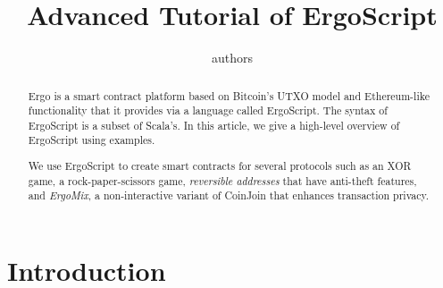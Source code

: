 \documentclass[11pt]{article}
\newcommand{\langname}{ErgoScript\xspace}
\newcommand{\mixname}{ErgoMix\xspace}
\begin{document}
\title{Advanced Tutorial of \langname}


\author{authors}


\maketitle


\begin{abstract}
Ergo is a smart contract platform based on Bitcoin's UTXO model and Ethereum-like functionality that it provides via a language called \langname. The syntax of \langname is a subset of Scala's. In this article, we give a high-level overview of \langname using examples.



We use \langname to create smart contracts for several protocols such as an XOR game, a rock-paper-scissors game, {\em reversible addresses} that have anti-theft features, and {\em \mixname}, a non-interactive variant of CoinJoin that enhances transaction privacy. 

\end{abstract}

\section{Introduction}
\end{document}
